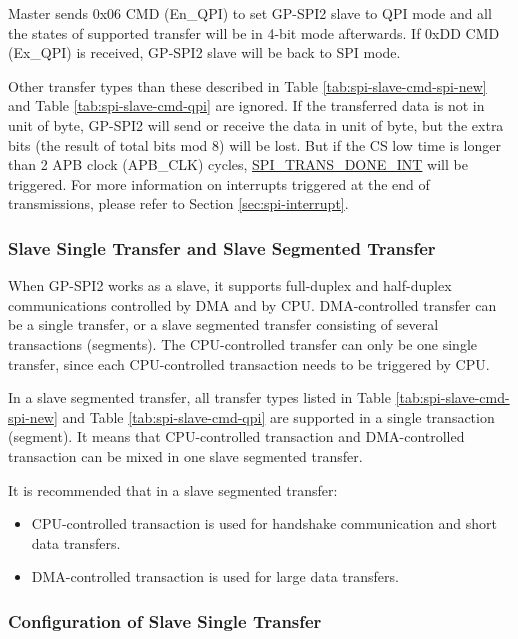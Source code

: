 \documentclass[main\_\_EN.tex]{subfiles}
\begin{document}
Master sends 0x06 CMD (En\_QPI) to set GP-SPI2 slave to QPI mode and all the states of supported transfer will be in 4-bit mode afterwards. If 0xDD CMD (Ex\_QPI) is received, GP-SPI2 slave will be back to SPI mode. 

Other transfer types than these described in Table \ref{tab:spi-slave-cmd-spi-new} and Table \ref{tab:spi-slave-cmd-qpi} are ignored. If the transferred data is not in unit of byte, GP-SPI2 will send or receive the data in unit of byte, but the extra bits (the result of total bits mod 8) will be lost. But if the CS low time is longer than 2 APB clock (APB\_CLK) cycles, \hyperref[int:SPITRANSDONEINT]{SPI\_TRANS\_DONE\_INT} will be triggered. For more information on interrupts triggered at the end of transmissions, please refer to Section \ref{sec:spi-interrupt}.

\subsubsection{Slave Single Transfer and Slave Segmented Transfer}\label{sec:gp-spi2-slave-seg-trans}

When GP-SPI2 works as a slave, it supports full-duplex and half-duplex communications controlled by DMA and by CPU. DMA-controlled transfer can be a single transfer, or a slave segmented transfer consisting of several transactions (segments). The CPU-controlled transfer can only be one single transfer, since each CPU-controlled transaction needs to be triggered by CPU.

In a slave segmented transfer, all transfer types listed in Table \ref{tab:spi-slave-cmd-spi-new} and Table \ref{tab:spi-slave-cmd-qpi} are supported in a single transaction (segment). It means that CPU-controlled transaction and DMA-controlled transaction can be mixed in one slave segmented transfer. 

It is recommended that in a slave segmented transfer:

\begin{itemize}
    \item CPU-controlled transaction is used for handshake communication and short data transfers.
    
    \item  DMA-controlled transaction is used for large data transfers.
\end{itemize}

\subsubsection{Configuration of Slave Single Transfer}\label{GP-SPI2 slave single transfer}
\end{document}
